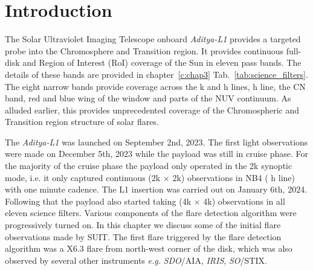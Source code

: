 \justifying

\section{Introduction} \label{sec:intro}

The Solar Ultraviolet Imaging Telescope onboard {\it Aditya-L1} \citep[{\it Aditya-L1}/SUIT,][]{article,ghosh16,adityal1,suit_main} provides a targeted probe into the Chromosphere and Transition region. It provides continuous full-disk and Region of Interest (RoI) coverage of the Sun in eleven pass bands. The details of these bands are provided in chapter~\ref{c:chap3} Tab.~\ref{tab:science_filters}. The eight narrow bands provide coverage across the  k and h lines,  h line, the CN band, red and blue wing of the  window and parts of the NUV continuum. As alluded earlier, this provides unprecedented coverage of the Chromospheric and Transition region structure of solar flares.

The {\it Aditya-L1} was launched on September 2nd, 2023. The first light observations were made on December 5th, 2023 while the payload was still in cruise phase. For the majority of the cruise phase the payload only operated in the 2k synoptic mode, i.e. it only captured continuous (2k $\times$ 2k) observations in NB4 ( h line) with one minute cadence. The L1 insertion was carried out on January 6th, 2024. Following that the payload also started taking (4k $\times$ 4k) observations in all eleven science filters. Various components of the flare detection algorithm were progressively turned on. In this chapter we discuss some of the initial flare observations made by SUIT. The first flare triggered by the flare detection algorithm was a X6.3 flare from north-west corner of the disk, which was also observed by several other instruments {\it e.g.} {\it SDO}/AIA, {\it IRIS}, {\it SO}/STIX.  